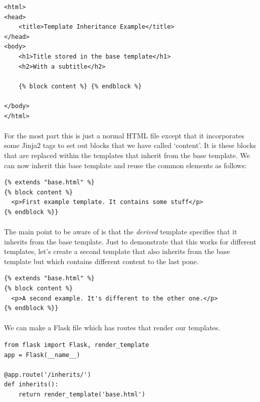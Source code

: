 \documentclass[12pt, a4paper, oneside]{book}
\begin{document}
{\begin{lstlisting}
<html>
<head>
    <title>Template Inheritance Example</title>
</head>
<body>
    <h1>Title stored in the base template</h1>
    <h2>With a subtitle</h2>

    {% block content %} {% endblock %}

</body>
</html>
\end{lstlisting}

\paragraph{} For the most part this is just a normal HTML file except that it incorporates some Jinja2 tags to set out blocks that we have called `content'. It is these blocks that are replaced within the templates that inherit from the base template. We can now inherit this base template and reuse the common elements as follows:

\begin{lstlisting}
{% extends "base.html" %}
{% block content %}
  <p>First example template. It contains some stuff</p>
{% endblock %}}
\end{lstlisting}

\paragraph{} The main point to be aware of is that the \emph{derived} template specifies that it inherits from the base template. Just to demonstrate that this works for different templates, let's create a second template that also inherits from the base template but which contains different content to the last pone.

\begin{lstlisting}
{% extends "base.html" %}
{% block content %}
  <p>A second example. It's different to the other one.</p>
{% endblock %}}
\end{lstlisting}

\paragraph{} We can make a Flask file which has routes that render our templates.

\begin{lstlisting}
from flask import Flask, render_template
app = Flask(__name__)

@app.route('/inherits/')
def inherits():
    return render_template('base.html')


\end{lstlisting}}
\end{document}
